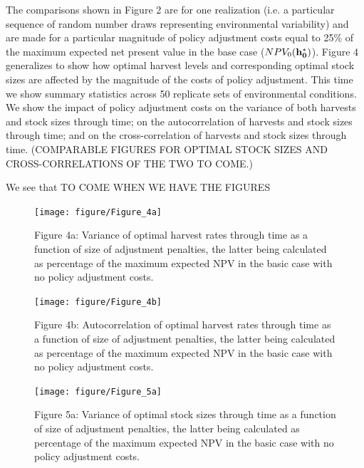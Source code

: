 \documentclass{article}\usepackage[]{graphicx}\usepackage[]{color}
\newenvironment{knitrout}{}{} %
\begin{document}
The comparisons shown in Figure 2 are for one realization (i.e. a particular sequence of random number draws representing environmental variability) and are made for a particular magnitude of policy adjustment costs equal to 25\% of the maximum expected net present value in the base case ($NPV_0({\bf h_0^*})$). Figure 4 generalizes to show how optimal harvest levels and corresponding optimal stock sizes are affected by the magnitude of the costs of policy adjustment. This time we show summary statistics across 50 replicate sets of environmental conditions. We show the impact of policy adjustment costs on the variance of both harvests and stock sizes through time; on the autocorrelation of harvests and stock sizes through time; and on the cross-correlation of harvests and stock sizes through time.  (COMPARABLE FIGURES FOR OPTIMAL STOCK SIZES AND CROSS-CORRELATIONS OF THE TWO TO COME.)

We see that TO COME WHEN WE HAVE THE FIGURES

\begin{figure}
\begin{knitrout}
\color{fgcolor}
\texttt{[image: figure/Figure\_4a]} 

\end{knitrout}


\caption*{Figure 4a: Variance of optimal harvest rates through time as a function of size of adjustment penalties, the latter being calculated as percentage of the maximum expected NPV in the basic case with no policy adjustment costs. }
\end{figure}

\begin{figure}
\begin{knitrout}
\color{fgcolor}
\texttt{[image: figure/Figure\_4b]} 

\end{knitrout}

\caption*{Figure 4b: Autocorrelation of optimal harvest rates through time as a function of size of adjustment penalties, the latter being calculated as percentage of the maximum expected NPV in the basic case with no policy adjustment costs. }
\end{figure}





\begin{figure}
\begin{knitrout}
\color{fgcolor}
\texttt{[image: figure/Figure\_5a]} 

\end{knitrout}


\caption*{Figure 5a: Variance of optimal stock sizes through time as a function of size of adjustment penalties, the latter being calculated as percentage of the maximum expected NPV in the basic case with no policy adjustment costs. }
\end{figure}
\end{document}
